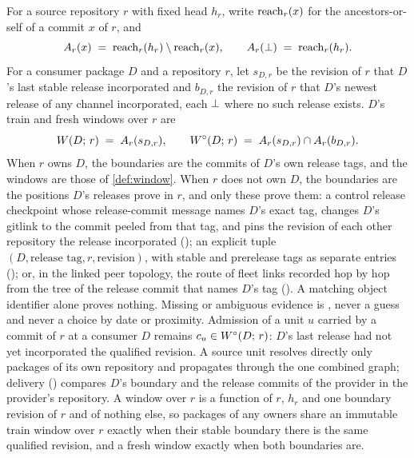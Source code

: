 \begin{definition}
\label{def:exec-windows}
For a source repository $r$ with fixed head $h_r$, write $\mathrm{reach}_{r}(x)$ for
the ancestors-or-self of a commit $x$ of $r$, and
\[
  A_{r}(x) \;=\; \mathrm{reach}_{r}(h_r) \setminus \mathrm{reach}_{r}(x),
  \qquad
  A_{r}(\bot) \;=\; \mathrm{reach}_{r}(h_r).
\]
For a consumer package $D$ and a repository $r$, let $s_{D,r}$ be the
revision of $r$ that $D$'s last stable release incorporated and $b_{D,r}$ the
revision of $r$ that $D$'s newest release of any channel incorporated, each
$\bot$ where no such release exists. $D$'s train and fresh windows over $r$
are
\[
  W(D;\,r) \;=\; A_{r}(s_{D,r}),
  \qquad
  W^{\circ}(D;\,r) \;=\; A_{r}(s_{D,r}) \cap A_{r}(b_{D,r}).
\]
When $r$ owns $D$, the boundaries are the commits of $D$'s own release tags,
and the windows are those of \cref{def:window}. When $r$ does not own $D$,
the boundaries are the positions $D$'s releases prove in $r$, and only these
prove them: a control release checkpoint whose release-commit message names
$D$'s exact tag, changes $D$'s gitlink to the commit peeled from that tag, and
pins the revision of each other repository the release incorporated
(); an explicit  tuple $(D,
\text{release tag}, r, \text{revision})$, with stable and prerelease tags as
separate entries (); or, in the linked peer topology, the route of
fleet links recorded hop by hop from the tree of the release commit that
names $D$'s tag (). A matching object identifier alone proves
nothing. Missing or ambiguous evidence is , never a guess and
never a choice by date or proximity. Admission of a unit $u$ carried by a
commit of $r$ at a consumer $D$ remains $c_{u} \in W^{\circ}(D;\,r)$: $D$'s
last release had not yet incorporated the qualified revision. A source unit
resolves directly only packages of its own repository and propagates through
the one combined graph; delivery () compares $D$'s boundary and
the release commits of the provider in the provider's repository. A window
over $r$ is a function of $r$, $h_r$ and one boundary revision of $r$ and of
nothing else, so packages of any owners share an immutable train window over
$r$ exactly when their stable boundary there is the same qualified revision,
and a fresh window exactly when both boundaries are.
\end{definition}

